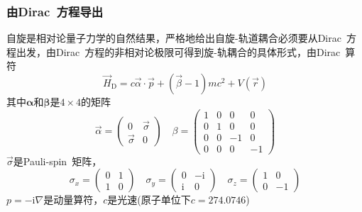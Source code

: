 \frame
{
	\frametitle{由\textrm{Dirac~}方程导出}
	自旋是相对论量子力学的自然结果，严格地给出自旋-轨道耦合必须要从\textrm{Dirac~}方程出发，由\textrm{Dirac~}方程的非相对论极限可得到旋-轨耦合的具体形式，由\textrm{Dirac~}算符
	\begin{displaymath}
		\vec H_{\mathrm D}=c\vec{\alpha}\cdot\vec p+(\vec{\beta}-1)mc^2+V(\vec r)
	\end{displaymath}
	其中$\mathbf{\alpha}$和$\mathbf{\beta}$是$4\times4$的矩阵
	\begin{displaymath}
		\vec{\alpha}=\left(
		\begin{matrix}
			0 &\vec{\sigma}\\
			\vec{\sigma} &0
		\end{matrix}
		\right)\quad\beta=\left(
		\begin{matrix}
			1 &0 &0 &0\\
			0 &1 &0 &0\\
			0 &0 &-1 &0\\
			0 &0 &0 &-1
		\end{matrix}
		\right)
	\end{displaymath}
	$\vec{\sigma}$是\textrm{Pauli-spin~}矩阵，
	\begin{displaymath}
		\sigma_x=\left( 
		\begin{matrix}
			0 &1\\
			1 &0
		\end{matrix}
		\right)\quad
		\sigma_y=\left( 
		\begin{matrix}
			0 &-\mathrm{i}\\
			\mathrm{i} &0
		\end{matrix}
		\right)\quad
		\sigma_z=\left( 
		\begin{matrix}
			1 &0\\
			0 &-1
		\end{matrix}
		\right)
	\end{displaymath}
	$p=-\mathrm{i}\nabla$是动量算符，$c$是光速(原子单位下$c=274.0746$)
}

